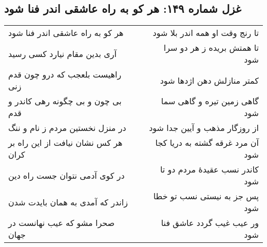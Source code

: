 \begin{center}
\section*{غزل شماره ۱۴۹: هر کو به راه عاشقی اندر فنا شود}
\label{sec:149}
\begin{longtable}{l p{0.5cm} r}
هر کو به راه عاشقی اندر فنا شود
&&
تا رنج وقت او همه اندر بلا شود
\\
آری بدین مقام نیارد کسی رسید
&&
تا همتش بریده ز هر دو سرا شود
\\
راهیست بلعجب که درو چون قدم زنی
&&
کمتر منازلش دهن اژدها شود
\\
بی چون و بی چگونه رهی کاندر و قدم
&&
گاهی زمین تیره و گاهی سما شود
\\
در منزل نخستین مردم ز نام و ننگ
&&
از روزگار مذهب و آیین جدا شود
\\
هر کس نشان نیافت از این راه بر کران
&&
آن مرد غرقه گشته به دریا کجا شود
\\
در کوی آدمی نتوان جست راه دین
&&
کاندر نسب عقیدهٔ مردم دو تا شود
\\
زاندر که آمدی به همان بایدت شدن
&&
پس جز به نیستی نسب تو خطا شود
\\
صحرا مشو که عیب نهانست در جهان
&&
ور عیب غیب گردد عاشق فنا شود
\\
\end{longtable}
\end{center}
